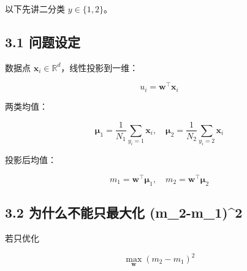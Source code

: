 \documentclass[
]{article}
\begin{document}
以下先讲二分类 \(y\in\{1,2\}\)。

\subsection{3.1 问题设定}\label{ux95eeux9898ux8bbeux5b9a}

数据点 \(\mathbf{x}_i\in\mathbb{R}^d\)，线性投影到一维：

\[
u_i=\mathbf{w}^\top \mathbf{x}_i
\]

两类均值：

\[
\boldsymbol{\mu}_1=\frac{1}{N_1}\sum_{y_i=1}\mathbf{x}_i,\quad
\boldsymbol{\mu}_2=\frac{1}{N_2}\sum_{y_i=2}\mathbf{x}_i
\]

投影后均值：

\[
m_1=\mathbf{w}^\top\boldsymbol{\mu}_1,\quad
m_2=\mathbf{w}^\top\boldsymbol{\mu}_2
\]

\subsection{3.2 为什么不能只最大化
(m\_2-m\_1)\^{}2}\label{ux4e3aux4ec0ux4e48ux4e0dux80fdux53eaux6700ux5927ux5316-m_2-m_12}

若只优化

\[
\max_{\mathbf{w}} (m_2-m_1)^2
\]
\end{document}
